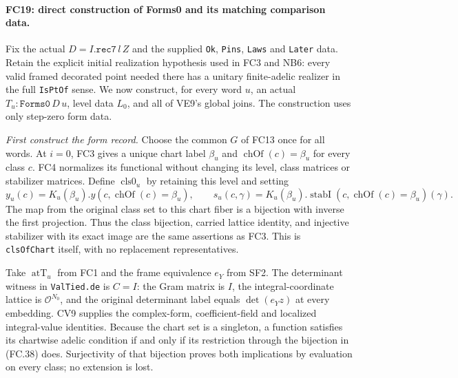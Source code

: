 \paragraph{FC19: direct construction of Forms0 and its matching comparison data.}
Fix the actual $D=I.\texttt{rec7}\,l\,Z$ and the supplied
\texttt{Ok}, \texttt{Pins}, \texttt{Laws} and \texttt{Later} data.
Retain the explicit initial realization hypothesis used in FC3 and
NB6: every valid framed decorated point needed there has a unitary
finite-adelic realizer in the full \texttt{IsPtOf} sense.
We now construct, for every word $u$, an actual
$T_u:\texttt{Forms0}\,D\,u$, level data $L_0$, and all of
VE9's global joins. The construction uses only step-zero form data.

\emph{First construct the form record.}
Choose the common $G$ of FC13 once for all words. At $i=0$, FC3
gives a unique chart label $\beta_u$ and
$\operatorname{chOf}(c)=\beta_u$ for every class $c$. FC4 normalizes
its functional without changing its level, class matrices or stabilizer
matrices. Define $\operatorname{cls0}_u$ by retaining this level and
setting
\[
 y_u(c)=K_u(\beta_u).y(c,\operatorname{chOf}(c)=\beta_u),\qquad
 s_u(c,\gamma)=K_u(\beta_u).\operatorname{stabI}
                      (c,\operatorname{chOf}(c)=\beta_u)(\gamma).
 \tag{FC.38}
\]
The map from the original class set to this chart fiber is a bijection
with inverse the first projection. Thus the class bijection, carried
lattice identity, and injective stabilizer with its exact image are
the same assertions as FC3. This is \texttt{clsOfChart} itself,
with no replacement representatives.

Take $\operatorname{atT}_u$ from FC1 and the frame equivalence $e_Y$
from SF2. The determinant witness in \texttt{ValTied.de} is $C=I$:
the Gram matrix is $I$, the integral-coordinate lattice is
$\mathcal O^{N_0}$, and the original determinant label equals
$\det(e_Y z)$ at every embedding. CV9 supplies the complex-form,
coefficient-field and localized integral-value identities.
Because the chart set is a singleton, a function satisfies its
chartwise adelic condition if and only if its restriction through
the bijection in (FC.38) does. Surjectivity of that bijection proves
both implications by evaluation on every class; no extension is lost.

